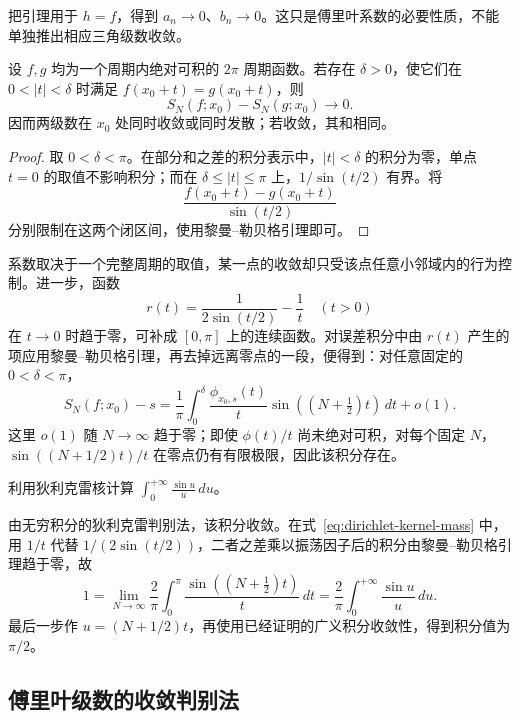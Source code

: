 \documentclass[UTF8,12pt,a4paper,fontset=fandol]{ctexbook}
\begin{document}
把引理用于 $h=f$，得到 $a_n\to0$、$b_n\to0$。这只是傅里叶系数的必要性质，不能单独推出相应三角级数收敛。

\begin{theorem}[黎曼局部化定理]
\label{thm:riemann-localization-fourier}
设 $f,g$ 均为一个周期内绝对可积的 $2\pi$ 周期函数。若存在 $\delta>0$，使它们在 $0<|t|<\delta$ 时满足 $f(x_0+t)=g(x_0+t)$，则
\[
    S_N(f;x_0)-S_N(g;x_0)\longrightarrow0.
\]
因而两级数在 $x_0$ 处同时收敛或同时发散；若收敛，其和相同。
\end{theorem}

\begin{proof}
取 $0<\delta<\pi$。在部分和之差的积分表示中，$|t|<\delta$ 的积分为零，单点 $t=0$ 的取值不影响积分；而在 $\delta\leq|t|\leq\pi$ 上，$1/\sin(t/2)$ 有界。将
\[
    \frac{f(x_0+t)-g(x_0+t)}{\sin(t/2)}
\]
分别限制在这两个闭区间，使用黎曼--勒贝格引理即可。
\end{proof}

系数取决于一个完整周期的取值，某一点的收敛却只受该点任意小邻域内的行为控制。进一步，函数
\[
    r(t)=\frac1{2\sin(t/2)}-\frac1t\quad(t>0)
\]
在 $t\to0$ 时趋于零，可补成 $[0,\pi]$ 上的连续函数。对误差积分中由 $r(t)$ 产生的项应用黎曼--勒贝格引理，再去掉远离零点的一段，便得到：对任意固定的 $0<\delta<\pi$，
\begin{equation}
    S_N(f;x_0)-s
       =\frac1\pi\int_0^\delta
           \frac{\phi_{x_0,s}(t)}t
                  \sin((N+\tfrac12)t)\,dt+o(1).
    \label{eq:localized-fourier-error}
\end{equation}
这里 $o(1)$ 随 $N\to\infty$ 趋于零；即使 $\phi(t)/t$ 尚未绝对可积，对每个固定 $N$，$\sin((N+1/2)t)/t$ 在零点仍有有限极限，因此该积分存在。

\begin{example}
\label{ex:dirichlet-sine-integral-value}
利用狄利克雷核计算 $\displaystyle\int_0^{+\infty}\frac{\sin u}{u}\,du$。
\end{example}

\begin{solve}
由无穷积分的狄利克雷判别法，该积分收敛。在式~\eqref{eq:dirichlet-kernel-mass} 中，用 $1/t$ 代替 $1/(2\sin(t/2))$，二者之差乘以振荡因子后的积分由黎曼--勒贝格引理趋于零，故
\[
    1=\lim_{N\to\infty}\frac2\pi\int_0^\pi
                  \frac{\sin((N+\tfrac12)t)}t\,dt
      =\frac2\pi\int_0^{+\infty}\frac{\sin u}{u}\,du.
\]
最后一步作 $u=(N+1/2)t$，再使用已经证明的广义积分收敛性，得到积分值为 $\pi/2$。
\end{solve}

\subsection{傅里叶级数的收敛判别法}
\label{subsec:convergence-tests-for-fourier-series}
\end{document}
